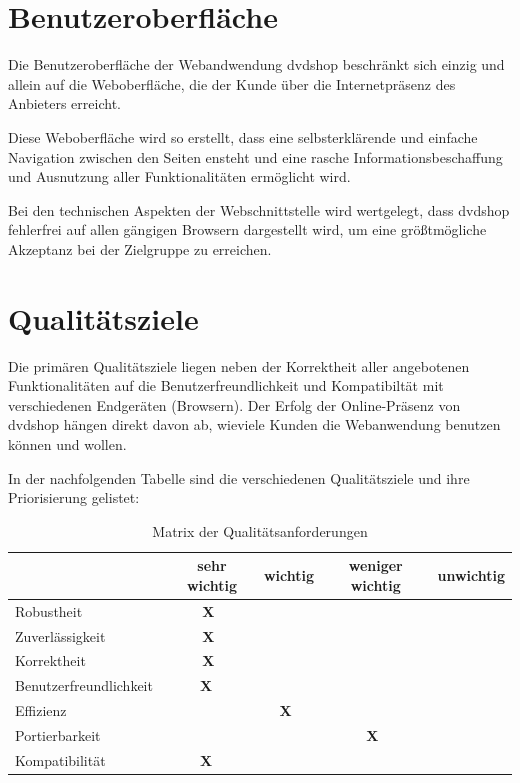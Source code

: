 \documentclass[12pt,oneside,a4paper,bibtotoc,liststotoc,pointlessnumbers]{scrartcl}
\begin{document}
\newpage
\section{Benutzeroberfläche}
Die Benutzeroberfläche der Webandwendung dvdshop beschränkt sich einzig und allein auf die Weboberfläche, die der Kunde über die Internetpräsenz des Anbieters erreicht.\par
Diese Weboberfläche wird so erstellt, dass eine selbsterklärende und einfache Navigation zwischen den Seiten ensteht und eine rasche Informationsbeschaffung und Ausnutzung aller Funktionalitäten ermöglicht wird.\par
Bei den technischen Aspekten der Webschnittstelle wird wertgelegt, dass dvdshop fehlerfrei auf allen gängigen Browsern dargestellt wird, um eine größtmögliche Akzeptanz bei der Zielgruppe zu erreichen.

\newpage
\section{Qualitätsziele}
Die primären Qualitätsziele liegen neben der Korrektheit aller angebotenen Funktionalitäten auf die Benutzerfreundlichkeit und Kompatibiltät mit verschiedenen Endgeräten (Browsern). Der Erfolg der Online-Präsenz von dvdshop hängen direkt davon ab, wieviele Kunden die Webanwendung benutzen können und wollen.\par
In der nachfolgenden Tabelle sind die verschiedenen Qualitätsziele und ihre Priorisierung gelistet:
\begin{table}[h]							
\begin{center}
 \begin{tabular}{l|c|c|c|c}
  ~ & sehr wichtig & wichtig & weniger wichtig & unwichtig\\
  \hline \hline
  Robustheit~ & \textbf{X}~ &  ~ ~ ~ &  ~ ~ ~ &  ~ ~ ~ \\
  \hline
  Zuverlässigkeit~ & \textbf{X}~ &  ~ ~ ~ &  ~ ~ ~ &  ~ ~ ~ \\
  \hline
  Korrektheit~ & \textbf{X}~ &  ~ ~ ~ &  ~ ~ ~ &  ~ ~ ~ \\
  \hline
  Benutzerfreundlichkeit~ &  \textbf{X} ~ & ~ ~ ~ &  ~ ~ ~ &  ~ ~ ~ \\
  \hline
  Effizienz~ &  ~ ~ ~ & \textbf{X}~ &  ~ ~ ~ &  ~ ~ ~ \\
  \hline
  Portierbarkeit~ &  ~ ~ ~ &  ~ ~ ~ & \textbf{X}~ &  ~ ~ ~ \\
  \hline
  Kompatibilität~ &  \textbf{X} ~ &  ~ ~ ~ & ~ ~ ~ &  ~ ~ ~ \\
 \end{tabular}
\end{center}
\caption{Matrix der Qualitätsanforderungen}									%
\label{fig:Qualitaet}												%
\end{table}
\end{document}
